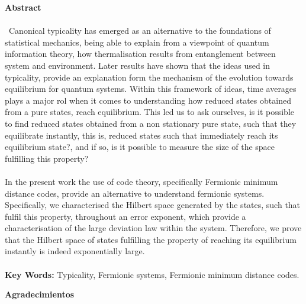 \textbf{\LARGE Abstract}\\\\
\
Canonical typicality has emerged as an alternative to the foundations of statistical mechanics, being able to explain from a viewpoint of quantum information theory, how thermalisation results from entanglement between system and environment. Later results have shown that the ideas used in typicality, provide an explanation form the mechanism of the evolution towards equilibrium for quantum systems. Within this framework of ideas, time averages plays a major rol when it comes to understanding how reduced states obtained from a pure states, reach equilibrium. This led us to ask ourselves, is it possible to find reduced states obtained from a non stationary pure state, such that they equilibrate instantly, this is, reduced states such that immediately reach its equilibrium state?, and if so, is it possible to measure the size of the space fulfilling this property? \\\\

In the present work the use of code theory, specifically Fermionic minimum distance codes, provide an alternative to understand fermionic systems. Specifically, we characterised the Hilbert space generated by the states, such that fulfil this property, throughout an error exponent, which provide a characterisation of the large deviation law within the system. Therefore, we prove that the Hilbert space of states fulfilling the property of reaching its equilibrium instantly is indeed exponentially large.\\\\
\textbf{\small Key Words: }Typicality, Fermionic systems, Fermionic minimum distance codes.
\newpage{}

\textbf{\LARGE Agradecimientos}

\newpage{}